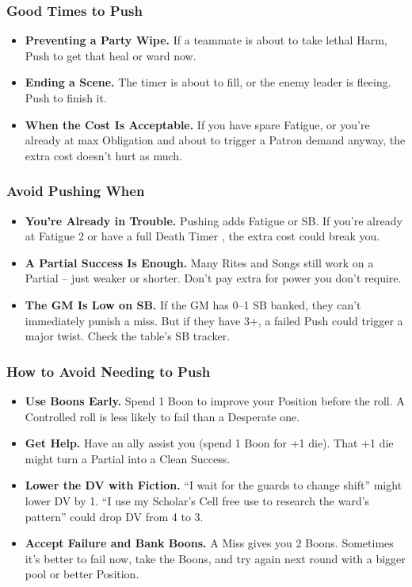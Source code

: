 \subsubsection*{Good Times to Push}
\begin{itemize}
  \item \textbf{Preventing a Party Wipe.} If a teammate is about to take lethal Harm, Push to get that heal or ward now.
  \item \textbf{Ending a Scene.} The timer is about to fill, or the enemy leader is fleeing. Push to finish it.
  \item \textbf{When the Cost Is Acceptable.} If you have spare Fatigue, or you're already at max Obligation and about to trigger a Patron demand anyway, the extra cost doesn't hurt as much.
\end{itemize}

\subsubsection*{Avoid Pushing When}
\begin{itemize}
  \item \textbf{You're Already in Trouble.} Pushing adds Fatigue or SB. If you're already at Fatigue 2 or have a full Death Timer , the extra cost could break you.
  \item \textbf{A Partial Success Is Enough.} Many Rites and Songs still work on a Partial -- just weaker or shorter. Don't pay extra for power you don't require.
  \item \textbf{The GM Is Low on SB.} If the GM has 0--1 SB banked, they can't immediately punish a miss. But if they have 3+, a failed Push could trigger a major twist. Check the table's SB tracker.
\end{itemize}

\subsubsection*{How to Avoid Needing to Push}
\begin{itemize}
  \item \textbf{Use Boons Early.} Spend 1 Boon to improve your Position before the roll. A Controlled roll is less likely to fail than a Desperate one.
  \item \textbf{Get Help.} Have an ally assist you (spend 1 Boon for +1 die). That +1 die might turn a Partial into a Clean Success.
  \item \textbf{Lower the DV with Fiction.} ``I wait for the guards to change shift'' might lower DV by 1. ``I use my Scholar's Cell free use to research the ward's pattern'' could drop DV from 4 to 3.
  \item \textbf{Accept Failure and Bank Boons.} A Miss gives you 2 Boons. Sometimes it's better to fail now, take the Boons, and try again next round with a bigger pool or better Position.
\end{itemize}


